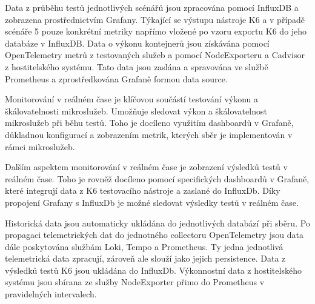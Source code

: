 
Data z průběhu testů jednotlivých scénářů jsou zpracována pomocí InfluxDB a zobrazena prostřednictvím Grafany. Týkající se výstupu nástroje K6 a v případě scénáře 5 pouze konkrétní metriky napřímo vložené po vzoru exportu K6 do jeho databáze v InfluxDB. Data o výkonu kontejnerů jsou získávána pomocí OpenTelemetry metrů z testovaných služeb a pomocí NodeExporteru a Cadvisor z hostitelského systému. Tato data jsou zaslána a spravována ve službě Prometheus a zprostředkována Grafaně formou data source.


Monitorování v reálném čase je klíčovou součástí testování výkonu a škálovatelnosti mikroslužeb. Umožňuje sledovat výkon a škálovatelnost mikroslužeb při běhu testů. Toho je docíleno využitím dashboardů v Grafaně, důkladnou konfigurací a zobrazením metrik, kterých sběr je implementován v rámci mikroslužeb.

Dalším aspektem monitorování v reálném čase je zobrazení výsledků testů v reálném čase. Toho je rovněž docíleno pomocí specifických dashboardů v Grafaně, které integrují data z K6 testovacího nástroje a zaslané do InfluxDb. Díky propojení Grafany s InfluxDb je možné sledovat výsledky testů v reálném čase.


Historická data jsou automaticky ukládána do jednotlivých databází při sběru. Po propagaci telemetrických dat do jednotného collectoru OpenTelemetry jsou data dále poskytována službám Loki, Tempo a Prometheus. Ty jedna jednotlivá telemetrická data zpracují, zároveň ale slouží jako jejich persistence. Data z výsledků testů K6 jsou ukládána do InfluxDb. Výkonnostní data z hostitelského systému jsou sbírana ze služby NodeExporter přimo do Prometheus v pravidelných intervalech.
